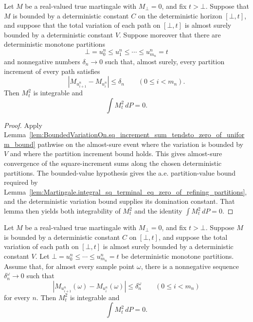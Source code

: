 \begin{lemma}\label{lem:Martingale.integral_sq_terminal_eq_zero_of_bounded_continuous_finiteVariation_of_variation_bound}
Let \(M\) be a real-valued true martingale with \(M_\bot=0\), and fix
\(t>\bot\).  Suppose that \(M\) is bounded by a deterministic constant \(C\)
on the deterministic horizon \([\bot,t]\), and suppose that the total
variation of each path on \([\bot,t]\) is almost surely bounded by a
deterministic constant \(V\).  Suppose moreover that there are deterministic
monotone partitions
\[
  \bot=u^n_0\le u^n_1\le\cdots\le u^n_{m_n}=t
\]
and nonnegative numbers \(\delta_n\to0\) such that, almost surely, every
partition increment of every path satisfies
\[
  |M_{u^n_{i+1}}-M_{u^n_i}|\le \delta_n
  \qquad (0\le i<m_n).
\]
Then \(M_t^2\) is integrable and
\[
  \int M_t^2\,dP=0 .
\]
\end{lemma}

\begin{proof}
Apply
Lemma~\ref{lem:BoundedVariationOn.sq_increment_sum_tendsto_zero_of_uniform_bound}
pathwise on the almost-sure event where the variation is bounded by \(V\) and
where the partition increment bound holds.  This gives almost-sure convergence
of the square-increment sums along the chosen deterministic partitions.  The
bounded-value hypothesis gives the a.e. partition-value bound required by
Lemma~\ref{lem:Martingale.integral_sq_terminal_eq_zero_of_refining_partitions},
and the deterministic variation bound supplies its domination constant.  That
lemma then yields both integrability of \(M_t^2\) and the identity
\(\int M_t^2\,dP=0\).
\end{proof}

\begin{lemma}\label{lem:Martingale.integral_sq_terminal_eq_zero_of_bounded_continuous_finiteVariation_of_variation_bound_eventual_modulus}
Let \(M\) be a real-valued true martingale with \(M_\bot=0\), and fix
\(t>\bot\).  Suppose \(M\) is bounded by a deterministic constant \(C\) on
\([\bot,t]\), and suppose the total variation of each path on \([\bot,t]\) is
almost surely bounded by a deterministic constant \(V\).  Let
\(\bot=u^n_0\le\cdots\le u^n_{m_n}=t\) be deterministic monotone partitions.
Assume that, for almost every sample point \(\omega\), there is a
nonnegative sequence \(\delta^\omega_n\to0\) such that
\[
  |M_{u^n_{i+1}}(\omega)-M_{u^n_i}(\omega)|
  \le \delta^\omega_n
  \qquad (0\le i<m_n)
\]
for every \(n\).  Then \(M_t^2\) is integrable and
\[
  \int M_t^2\,dP=0 .
\]
\end{lemma}

